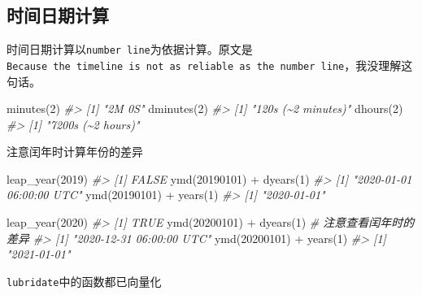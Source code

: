 \documentclass[
]{book}
\newenvironment{Shaded}{\begin{snugshade}}{\end{snugshade}}
\newcommand{\CommentTok}[1]{\textcolor[rgb]{0.56,0.35,0.01}{\textit{#1}}}
\newcommand{\DecValTok}[1]{\textcolor[rgb]{0.00,0.00,0.81}{#1}}
\newcommand{\FunctionTok}[1]{\textcolor[rgb]{0.00,0.00,0.00}{#1}}
\newcommand{\NormalTok}[1]{#1}
\newcommand{\SpecialCharTok}[1]{\textcolor[rgb]{0.00,0.00,0.00}{#1}}
\begin{document}
\hypertarget{calculate-datetime}{%
\subsection{时间日期计算}\label{calculate-datetime}}

时间日期计算以\texttt{number\ line}为依据计算。原文是\texttt{Because\ the\ timeline\ is\ not\ as\ reliable\ as\ the\ number\ line}，我没理解这句话。

\begin{Shaded}
\begin{Highlighting}[]
\FunctionTok{minutes}\NormalTok{(}\DecValTok{2}\NormalTok{)}
\CommentTok{\#\textgreater{} [1] "2M 0S"}
\FunctionTok{dminutes}\NormalTok{(}\DecValTok{2}\NormalTok{)}
\CommentTok{\#\textgreater{} [1] "120s (\textasciitilde{}2 minutes)"}
\FunctionTok{dhours}\NormalTok{(}\DecValTok{2}\NormalTok{)}
\CommentTok{\#\textgreater{} [1] "7200s (\textasciitilde{}2 hours)"}
\end{Highlighting}
\end{Shaded}

注意闰年时计算年份的差异

\begin{Shaded}
\begin{Highlighting}[]
\FunctionTok{leap\_year}\NormalTok{(}\DecValTok{2019}\NormalTok{)}
\CommentTok{\#\textgreater{} [1] FALSE}
\FunctionTok{ymd}\NormalTok{(}\DecValTok{20190101}\NormalTok{) }\SpecialCharTok{+} \FunctionTok{dyears}\NormalTok{(}\DecValTok{1}\NormalTok{)}
\CommentTok{\#\textgreater{} [1] "2020{-}01{-}01 06:00:00 UTC"}
\FunctionTok{ymd}\NormalTok{(}\DecValTok{20190101}\NormalTok{) }\SpecialCharTok{+} \FunctionTok{years}\NormalTok{(}\DecValTok{1}\NormalTok{)}
\CommentTok{\#\textgreater{} [1] "2020{-}01{-}01"}

\FunctionTok{leap\_year}\NormalTok{(}\DecValTok{2020}\NormalTok{)}
\CommentTok{\#\textgreater{} [1] TRUE}
\FunctionTok{ymd}\NormalTok{(}\DecValTok{20200101}\NormalTok{) }\SpecialCharTok{+} \FunctionTok{dyears}\NormalTok{(}\DecValTok{1}\NormalTok{)  }\CommentTok{\# 注意查看闰年时的差异}
\CommentTok{\#\textgreater{} [1] "2020{-}12{-}31 06:00:00 UTC"}
\FunctionTok{ymd}\NormalTok{(}\DecValTok{20200101}\NormalTok{) }\SpecialCharTok{+} \FunctionTok{years}\NormalTok{(}\DecValTok{1}\NormalTok{)}
\CommentTok{\#\textgreater{} [1] "2021{-}01{-}01"}
\end{Highlighting}
\end{Shaded}

\texttt{lubridate}中的函数都已向量化
\end{document}
